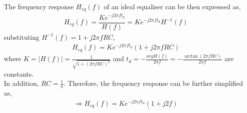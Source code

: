 \documentclass[11pt]{article}
\begin{document}
\begin{enumerate}[label=(\alph*)]
The frequency response $H_{eq}(f)$ of an ideal equaliser can be then expressed as,
\begin{align*}
    H_{eq}(f)=\dfrac{Ke^{-j2 \pi f t_d}}{H(f)}=Ke^{-j2 \pi f t_d}H^{-1}(f)
\end{align*}
substituting $H^{-1}(f)=1+j2\pi f RC$, 
\begin{align*}
   H_{eq}(f)=  Ke^{-j2 \pi f t_d}(1+j2\pi f RC)
\end{align*}
where $K = |H(f)| = \frac{1}{\sqrt{1 + (2\pi f RC)^2}}$ and $t_d = -\frac{arg H(f)}{2\pi f} = -\frac{\arctan(2\pi fRC)}{2\pi f}$ are constants.\\

In addition, $RC=\frac{1}{\pi}$. Therefore, the frequency response can be further simplified as,
\begin{align*}
  \Rightarrow H_{eq}(f)=  \underline{Ke^{-j2 \pi f t_d}(1+j2f)}
\end{align*}


\end{enumerate}
\end{document}
